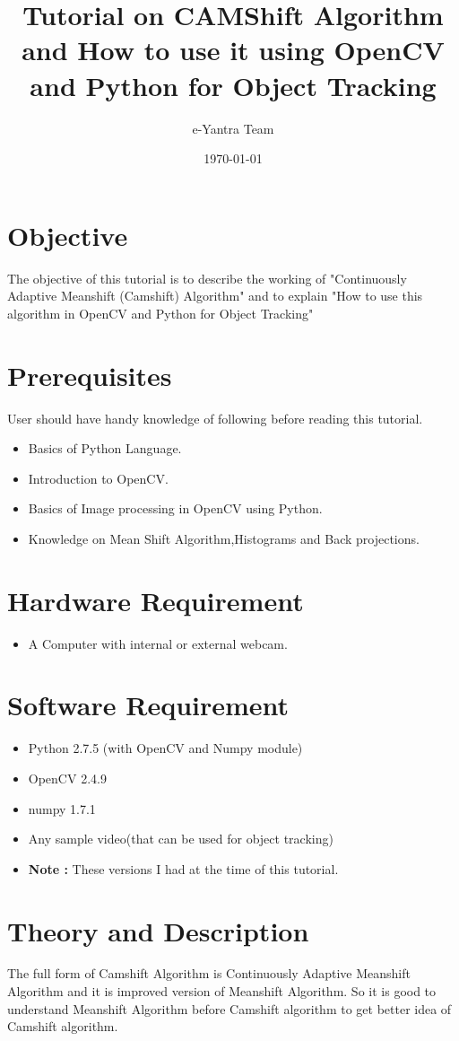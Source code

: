 \documentclass[11pt,a4paper]{article}
\title{Tutorial on CAMShift Algorithm and How to use it using OpenCV and Python for Object Tracking}
\author{e-Yantra Team}
\date{\today}
\begin{document}
	\maketitle
	\newpage
	\tableofcontents
	\newpage
	\section{Objective}
		The objective of this tutorial is to describe the working of "Continuously Adaptive Meanshift (Camshift) Algorithm" and to explain "How to use this algorithm in OpenCV and Python for Object Tracking"
	\section{Prerequisites}
		User should have handy knowledge of following before reading this tutorial.
		\begin{itemize}
			\item Basics of Python Language.
			\item Introduction to OpenCV.
			\item Basics of Image processing in OpenCV using Python.
			\item Knowledge on Mean Shift Algorithm,Histograms and Back projections.
		\end{itemize}
	\section{Hardware Requirement}
		\begin{itemize}
			\item A Computer with internal or external webcam.
		\end{itemize}
	\section{Software Requirement}
		\begin{itemize}
			\item Python 2.7.5 (with OpenCV and Numpy module)
			\item OpenCV 2.4.9 
			\item numpy 1.7.1
			\item Any sample video(that can be used for object tracking)
			\item \textbf{Note :} These versions I had at the time of this tutorial.
		\end{itemize}
	\section{Theory and Description}
		The full form of Camshift Algorithm is Continuously Adaptive Meanshift Algorithm and it is improved version of Meanshift Algorithm. So it is good to understand Meanshift Algorithm before Camshift algorithm to get better idea of Camshift algorithm.
\end{document}
